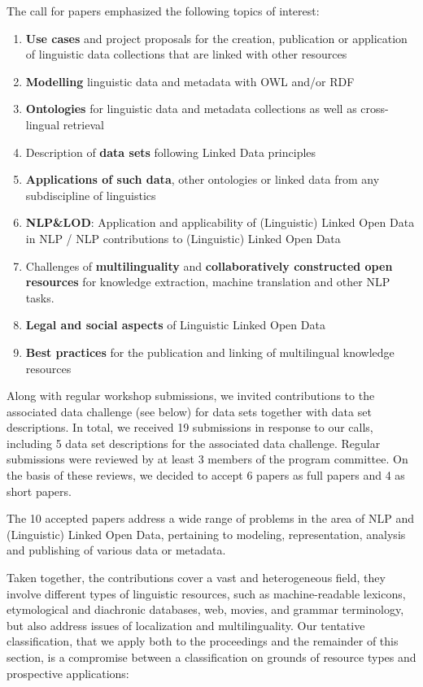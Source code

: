The call for papers emphasized the following topics of interest:

\begin{enumerate}
\item \textbf{Use cases} and project proposals for the creation, publication or application of linguistic data collections that are linked with other resources
\item \textbf{Modelling} linguistic data and metadata with OWL and/or RDF
\item \textbf{Ontologies} for linguistic data and metadata collections as well as cross-lingual retrieval
\item Description of \textbf{data sets} following Linked Data principles
\item \textbf{Applications of such data}, other ontologies or linked data from any subdiscipline of linguistics %
\item \textbf{NLP\&LOD}: Application and applicability of (Linguistic) Linked Open Data in NLP / NLP contributions to (Linguistic) Linked Open Data
\item Challenges of \textbf{multilinguality} and \textbf{collaboratively constructed open resources} %
for knowledge extraction, machine translation and other NLP tasks.
\item \textbf{Legal and social aspects} of Linguistic Linked Open Data
\item \textbf{Best practices} for the publication and linking of multilingual knowledge resources
\end{enumerate}

\noindent 
Along with regular workshop submissions, we invited contributions to the associated data challenge (see below) for data sets together with data set descriptions.
In total, we received 19 submissions in response to our calls, including 5 data set descriptions for the associated data challenge. Regular submissions were reviewed by at least 3 
members of the program committee. 
On the basis of these reviews, we decided to accept 6 papers as full papers and 4 as short papers.

The 10 accepted papers address a wide range of problems in the area of NLP and (Linguistic) Linked Open Data, pertaining to modeling, representation, analysis and publishing of various 
data or metadata.

Taken together, the contributions cover a vast and heterogeneous field, they involve different types of linguistic resources, such as machine-readable lexicons, etymological and diachronic databases, web, movies, and grammar terminology, but also address issues of localization and multilinguality. Our tentative classification, that we apply both to the proceedings and the remainder of this section, is a compromise between a classification on grounds of resource types and prospective applications:

